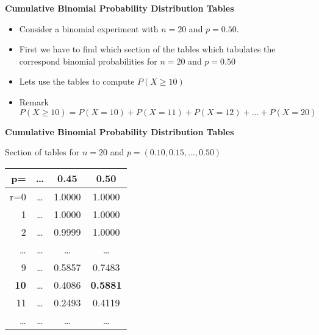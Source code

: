 \documentclass[a4]{beamer}
\begin{document}
{
\textbf{Cumulative Binomial Probability Distribution Tables}

\begin{itemize}
\item Consider a binomial experiment with $n = 20$ and $p = 0.50$.

\item First we have to find which section of the tables which tabulates the correspond binomial probabilities for $n = 20$ and $p = 0.50$

\item Lets use the tables to compute $P(X \geq 10)$

\item Remark $P(X \geq 10) = P(X=10) + P(X=11) + P(X=12)+ \ldots +  P(X=20)$

\end{itemize}

}
{
\textbf{Cumulative Binomial Probability Distribution Tables}

Section of tables for $n=20$ and $p = (0.10,0.15, \ldots, 0.50)$
\begin{center}
\begin{tabular}{|r||c|c|c|}
  \hline
  p= & \ldots & 0.45 & \textbf{0.50} \\ \hline \hline
  r=0 & \ldots & 1.0000 & 1.0000 \\
  1 & \ldots & 1.0000 & 1.0000 \\
  2 & \ldots & 0.9999 & 1.0000 \\
  \ldots & \ldots & \ldots & \ldots \\
  9  & \ldots & 0.5857 & 0.7483 \\
  \textbf{10} & \ldots & 0.4086 & \alert{\textbf{0.5881}} \\
  11 & \ldots & 0.2493 & 0.4119 \\
  \ldots & \ldots & \ldots & \ldots \\
  \hline
\end{tabular}
\end{center}

}
\end{document}
